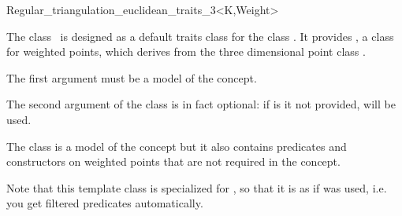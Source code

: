 

\begin{ccRefClass}{Regular_triangulation_euclidean_traits_3<K,Weight>}  %


\ccDefinition
  
The class \ccRefName\ is designed as a default traits class for the
class . 
It provides , a class for weighted points, which derives
from the three dimensional point class .

The first argument  must be a model of the  concept. 

The second argument  of the class
 is in fact
optional: if is it not provided,  will be used.

The class is a model of the concept 
but it also contains predicates and constructors on weighted points
that are not required in the
concept.

Note that this template class is specialized for
, so that it is as if
 was used, i.e. you get
filtered predicates automatically.

 



\ccIsModel
{}


\ccTypes
{}


\end{ccRefClass}

